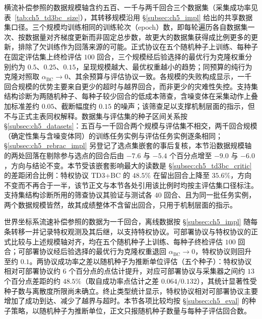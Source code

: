 横流补偿参照的数据规模轴含约五百、一千与两千回合三个数据集（采集成功率见表~\ref{tab:ch5_td3bc_size}），其转移规模沿用 \S\ref{subsec:ch5_impl} 给出的共享数据集口径。三个规模均训练相同的训练轮次（epoch）数，即每轮遍历各自数据集一次、按数据量对齐梯度更新而非固定总步数，故更大的数据集获得成比例更多的更新，排除了欠训练作为回落来源的可能。正式协议在五个随机种子上训练、每种子在固定评估集上终检评估 $100$ 回合，三个规模经后验选择的最优行为克隆权重分别约为 $0.5$、$0.25$、$0.15$，呈现规模越大、最优权重越小的趋势；同预算的纯行为克隆对照取 $\alpha_{\mathrm{BC}}\to 0$、其余预算与评估协议一致。各规模的失败构成显示，一千回合规模的优势主要来自更少的超时与越界回合，而非更少的灾难性失控。支持集结构诊断为两随机种子、每种子较少回合的低成本筛查，含噪变体在采集动作上叠加标准差约 $0.05$、截断幅度约 $0.15$ 的噪声；该筛查足以支撑机制层面的指示，但不与正式主表同权解释。数据集与评估集的种子区间关系按 \S\ref{subsec:ch5_datasets}：五百与一千回合两个规模与评估集不相交，两千回合规模（确定性集与含噪变体同）的训练任务实例与评估任务实例逐条相同；\S\ref{subsec:ch5_rebrac_impl} 另登记了选点集嵌套的事后复核，本节沿数据规模轴的两处回落在剔除参与选点的回合后由 $-7.6$ 与 $-5.4$ 个百分点增至 $-9.0$ 与 $-6.0$，方向与结论不变。本节受该嵌套影响最大的读数是 \S\ref{subsec:ch5_td3bc_critic} 的差距闭合比例：特权协议 TD3+BC 的 $48.5\%$ 在留出回合上降至 $35.6\%$，方向不变而不再合于一半，该节正文与本节各处引用该比例时均按主评估集口径标注。支持集结构诊断所用的筛查协议其验证与测试各 $40$ 回合、且为同一批任务实例，两个数据规模皆然，故其成绩整体不含留出回合，只用于机制层面的指示。

世界坐标系流速补偿参照的数据为一千回合，离线数据按 \S\ref{subsec:ch5_impl} 随每条转移一并记录特权观测及其后继，以支持特权协议。可部署协议与特权协议的正式比较与上述规模轴对齐，均在五个随机种子上训练、每种子终检评估 $100$ 回合；可部署协议经后验选择的最优行为克隆权重退回 $\alpha_{\mathrm{BC}}\to 0$，特权协议则回升至约 $0.1$。两协议成功率之差以随机种子为推断单位评估（五个种子）：特权协议相对可部署协议约 $6$ 个百分点的点估计提升，对应可部署协议与采集器之间约 $13$ 个百分点差距的约 $48.5\%$（取自成功率点估计之差 $0.064/0.132$），其统计显著性受种子数与离散度所限尚未确立。终止类型统计显示，特权协议相对可部署协议主要增加了成功到达、减少了越界与超时。本节各项比较均按 \S\ref{subsec:ch5_eval} 的种子策略，以随机种子为推断单位，正文只报随机种子数量与每种子评估回合数。
